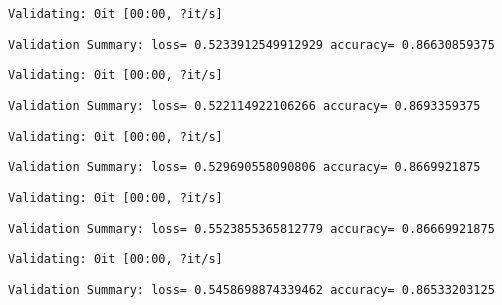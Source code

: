 \documentclass[11pt]{article}
\begin{document}
    
    \begin{Verbatim}[commandchars=\\\{\}]
Validating: 0it [00:00, ?it/s]
    \end{Verbatim}

    
    \begin{Verbatim}[commandchars=\\\{\}]
Validation Summary: loss= 0.5233912549912929 accuracy= 0.86630859375
    \end{Verbatim}

    
    \begin{Verbatim}[commandchars=\\\{\}]
Validating: 0it [00:00, ?it/s]
    \end{Verbatim}

    
    \begin{Verbatim}[commandchars=\\\{\}]
Validation Summary: loss= 0.522114922106266 accuracy= 0.8693359375
    \end{Verbatim}

    
    \begin{Verbatim}[commandchars=\\\{\}]
Validating: 0it [00:00, ?it/s]
    \end{Verbatim}

    
    \begin{Verbatim}[commandchars=\\\{\}]
Validation Summary: loss= 0.529690558090806 accuracy= 0.8669921875
    \end{Verbatim}

    
    \begin{Verbatim}[commandchars=\\\{\}]
Validating: 0it [00:00, ?it/s]
    \end{Verbatim}

    
    \begin{Verbatim}[commandchars=\\\{\}]
Validation Summary: loss= 0.5523855365812779 accuracy= 0.86669921875
    \end{Verbatim}

    
    \begin{Verbatim}[commandchars=\\\{\}]
Validating: 0it [00:00, ?it/s]
    \end{Verbatim}

    
    \begin{Verbatim}[commandchars=\\\{\}]
Validation Summary: loss= 0.5458698874339462 accuracy= 0.86533203125
    \end{Verbatim}
\end{document}
